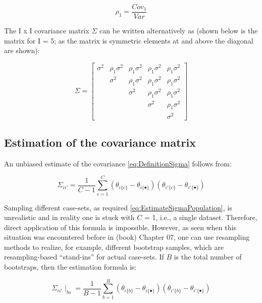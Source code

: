 \documentclass[
]{book}
\begin{document}
\[\rho_1=\frac{Cov_1}{Var}\]

The I x I covariance matrix \(\Sigma\) can be written alternatively as (shown below is the matrix for I = 5; as the matrix is symmetric elements at and above the diagonal are shown):

\begin{equation}
\Sigma = 
\begin{bmatrix}
\sigma^2 & \rho_1\sigma^2 & \rho_1\sigma^2 & \rho_1\sigma^2 & \rho_1\sigma^2\\
& \sigma^2 & \rho_1\sigma^2 & \rho_1\sigma^2 & \rho_1\sigma^2\\
&  & \sigma^2 & \rho_1\sigma^2 & \rho_1\sigma^2\\
&  &  & \sigma^2 & \rho_1\sigma^2\\
&  &  &  & \sigma^2
\end{bmatrix}
\label{eq:ExampleSigmaRho}
\end{equation}

\hypertarget{estimation-of-the-covariance-matrix}{%
\subsection{Estimation of the covariance matrix}\label{estimation-of-the-covariance-matrix}}

An unbiased estimate of the covariance \eqref{eq:DefinitionSigma} follows from:

\begin{equation}
\Sigma_{ii'}=\frac{1}{C-1}\sum_{c=1}^{C} \left ( \theta_{i\{c\}} - \theta_{i\{\bullet\}} \right) \left ( \theta_{i'\{c\}} - \theta_{i'\{\bullet\}} \right)
\label{eq:EstimateSigmaPopulation}
\end{equation}

Sampling different case-sets, as required \eqref{eq:EstimateSigmaPopulation}, is unrealistic and in reality one is stuck with \(C\) = 1, i.e., a single dataset. Therefore, direct application of this formula is impossible. However, as seen when this situation was encountered before in (book) Chapter 07, one can use resampling methods to realize, for example, different bootstrap samples, which are resampling-based ``stand-ins'' for actual case-sets. If \(B\) is the total number of bootstraps, then the estimation formula is:

\begin{equation}
\Sigma_{ii'}\mid_{bs} =\frac{1}{B-1}\sum_{b=1}^{B} \left ( \theta_{i\{b\}} - \theta_{i\{\bullet\}} \right) \left ( \theta_{i'\{b\}} - \theta_{i'\{\bullet\}} \right)
\label{eq:EstimateSigmaBootstrap}
\end{equation}
\end{document}
